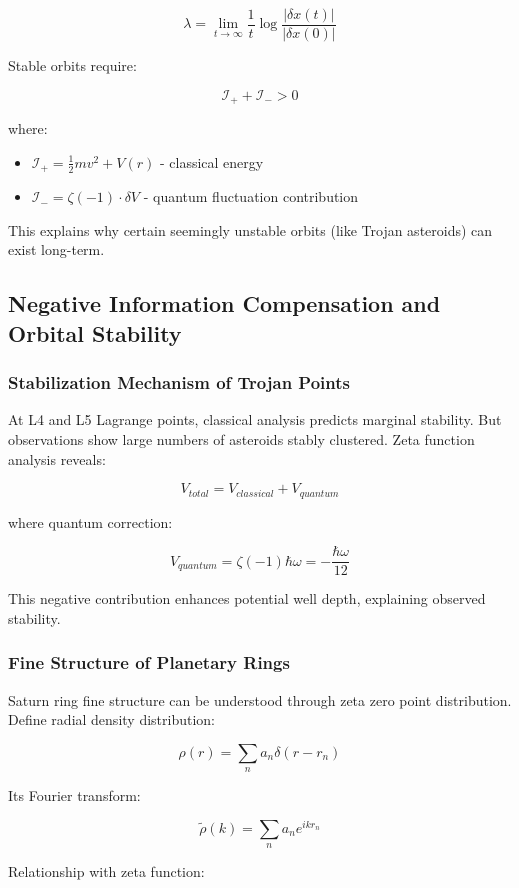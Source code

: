 \documentclass[12pt,a4paper]{article}
\begin{document}
$$\lambda = \lim_{t \to \infty} \frac{1}{t} \log \frac{|\delta x(t)|}{|\delta x(0)|}$$

Stable orbits require:

$$\mathcal{I}_+ + \mathcal{I}_- > 0$$

where:
\begin{itemize}
\item $\mathcal{I}_+ = \frac{1}{2}mv^2 + V(r)$ - classical energy
\item $\mathcal{I}_- = \zeta(-1) \cdot \delta V$ - quantum fluctuation contribution
\end{itemize}

This explains why certain seemingly unstable orbits (like Trojan asteroids) can exist long-term.

\subsection{Negative Information Compensation and Orbital Stability}

\subsubsection{Stabilization Mechanism of Trojan Points}

At L4 and L5 Lagrange points, classical analysis predicts marginal stability. But observations show large numbers of asteroids stably clustered. Zeta function analysis reveals:

$$V_{total} = V_{classical} + V_{quantum}$$

where quantum correction:

$$V_{quantum} = \zeta(-1) \hbar \omega = -\frac{\hbar\omega}{12}$$

This negative contribution enhances potential well depth, explaining observed stability.

\subsubsection{Fine Structure of Planetary Rings}

Saturn ring fine structure can be understood through zeta zero point distribution. Define radial density distribution:

$$\rho(r) = \sum_{n} a_n \delta(r - r_n)$$

Its Fourier transform:

$$\tilde{\rho}(k) = \sum_{n} a_n e^{ikr_n}$$

Relationship with zeta function:
\end{document}
